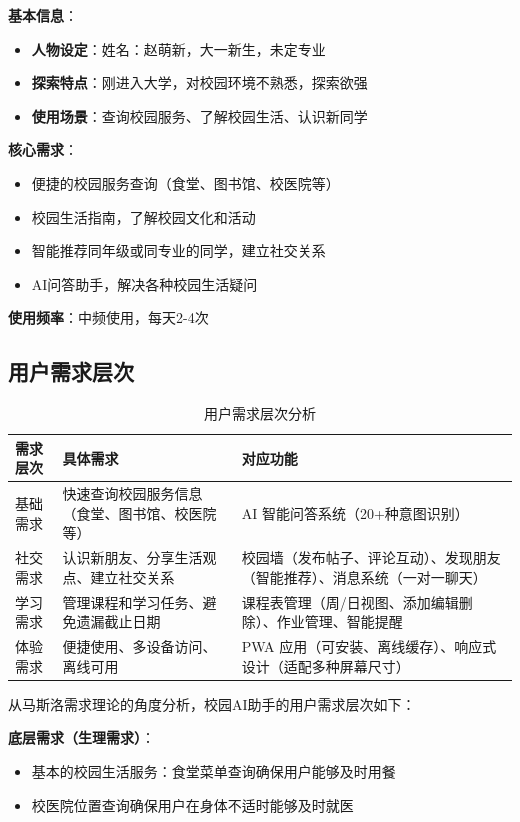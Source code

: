 \documentclass[12pt,a4paper]{article}
\begin{document}
\textbf{基本信息}：
\begin{itemize}
    \item \textbf{人物设定}：姓名：赵萌新，大一新生，未定专业
    \item \textbf{探索特点}：刚进入大学，对校园环境不熟悉，探索欲强
    \item \textbf{使用场景}：查询校园服务、了解校园生活、认识新同学
\end{itemize}

\textbf{核心需求}：
\begin{itemize}
    \item 便捷的校园服务查询（食堂、图书馆、校医院等）
    \item 校园生活指南，了解校园文化和活动
    \item 智能推荐同年级或同专业的同学，建立社交关系
    \item AI问答助手，解决各种校园生活疑问
\end{itemize}

\textbf{使用频率}：中频使用，每天2-4次

\subsection{用户需求层次}

\begin{table}[h]
\centering
\begin{tabular}{|l|p{6cm}|p{6cm}|}
\hline
\textbf{需求层次} & \textbf{具体需求} & \textbf{对应功能} \\
\hline
基础需求 & 快速查询校园服务信息（食堂、图书馆、校医院等） & AI 智能问答系统（20+种意图识别） \\
\hline
社交需求 & 认识新朋友、分享生活观点、建立社交关系 & 校园墙（发布帖子、评论互动）、发现朋友（智能推荐）、消息系统（一对一聊天） \\
\hline
学习需求 & 管理课程和学习任务、避免遗漏截止日期 & 课程表管理（周/日视图、添加编辑删除）、作业管理、智能提醒 \\
\hline
体验需求 & 便捷使用、多设备访问、离线可用 & PWA 应用（可安装、离线缓存）、响应式设计（适配多种屏幕尺寸） \\
\hline
\end{tabular}
\caption{用户需求层次分析}
\end{table}

从马斯洛需求理论的角度分析，校园AI助手的用户需求层次如下：

\textbf{底层需求（生理需求）}：
\begin{itemize}
    \item 基本的校园生活服务：食堂菜单查询确保用户能够及时用餐
    \item 校医院位置查询确保用户在身体不适时能够及时就医
\end{itemize}
\end{document}

